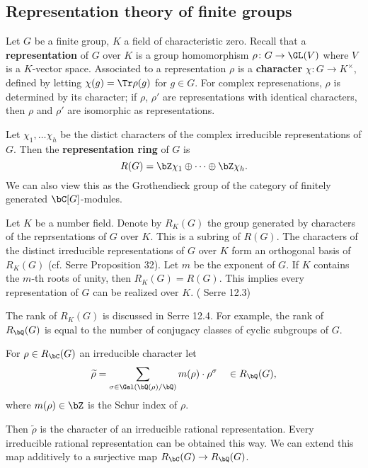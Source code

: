 \subsection{Representation theory of finite groups}\label{rep}

Let $G$ be a finite group, $K$ a field of characteristic zero. Recall that a \textbf{representation} of $G$ over $K$ is a group homomorphism $\rho \colon G \to \GL(V)$ where $V$ is a $K$-vector space. Associated to a representation $\rho$ is a \textbf{character} $\chi \colon G \to K^{\times}$, defined by letting $\chi(g) = \Tr \rho(g)$ for $g \in G$. For complex represenations, $\rho$ is determined by its character; if $\rho$, $\rho'$ are representations with identical characters, then $\rho$ and $\rho'$ are isomorphic as representations. 

\begin{defn}
Let $\chi_1, \ldots \chi_h$ be the distict characters of the complex irreducible representations of $G$. 
Then the \textbf{representation ring} of $G$ is 
\[ R(G) = \bZ \chi_1 \oplus \cdots \oplus \bZ \chi_h .\]
We can also view this as the Grothendieck group of the category of finitely generated $\bC[G]$-modules.
\end{defn}

Let $K$ be a number field. Denote by $R_K(G)$ the group generated by characters of the reprsentations of $G$ over $K$. This is a subring of $R(G)$. The characters of the distinct irreducible representations of $G$ over $K$ form an orthogonal basis of $R_K(G)$ {\color{red}(cf. Serre Proposition 32).}
Let $m$ be the exponent of $G$. If $K$ contains the $m$-th roots of unity, then $R_K(G) = R(G)$. This implies every representation of $G$ can be realized over $K$. ({\color{red} Serre 12.3})

The rank of $R_K(G)$ is discussed in {\color{red} Serre 12.4}. For example, the rank of $R_{\bQ}(G)$ is equal to the number of conjugacy classes of cyclic subgroups of $G$. 

\begin{notn}
For $\rho \in R_{\bC}(G)$ an irreducible character let 
\[  \widetilde{\rho} = \sum_{\sigma \in \Gal(\bQ(\rho)/\bQ)}m(\rho)\cdot \rho^\sigma \quad \in R_{\bQ}(G) , \]
where $m(\rho) \in \bZ$ is the Schur index of $\rho$.
\end{notn}
Then $\widetilde{\rho}$ is the character of an irreducible rational representation. Every irreducible rational representation can be obtained this way. We can extend this map additively to a surjective map $R_{\bC}(G) \to R_{\bQ}(G)$. 

